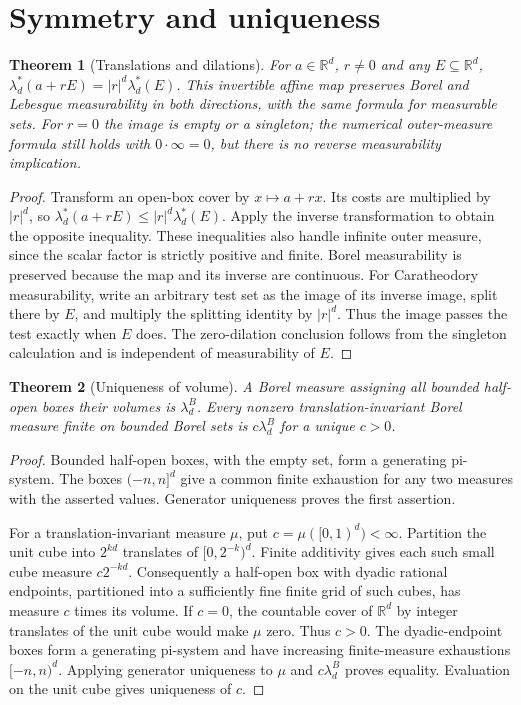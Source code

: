 \documentclass[11pt,oneside,openany]{book}
\newtheorem{theorem}{Theorem}[chapter]
\theoremstyle{definition}
\theoremstyle{remark}
\newcommand{\R}{\mathbb R}\newcommand{\C}{\mathbb C}
\newcommand{\family}[1]{}
\begin{document}
\section{Symmetry and uniqueness}

\begin{theorem}[Translations and dilations]
\family{D11.03.translation_dilation}\label{d11:03:translation-dilation}
For $a\in\R^d$, $r\ne0$ and any $E\subseteq\R^d$,
$\lambda_d^*(a+rE)=|r|^d\lambda_d^*(E)$. This invertible affine map
preserves Borel and Lebesgue measurability in both directions, with the same
formula for measurable sets. For $r=0$ the image is empty or a singleton;
the numerical outer-measure formula still holds with $0\cdot\infty=0$,
but there is no reverse measurability implication.
\end{theorem}
\begin{proof}
Transform an open-box cover by $x\mapsto a+rx$. Its costs are multiplied
by $|r|^d$, so $\lambda_d^*(a+rE)\leq|r|^d\lambda_d^*(E)$.
Apply the inverse transformation to obtain the opposite inequality.
These inequalities also handle infinite outer measure, since the scalar
factor is strictly positive and finite. Borel measurability is preserved
because the map and its inverse are continuous. For Caratheodory measurability,
write an arbitrary test set as the image of its inverse image, split there by
$E$, and multiply the splitting identity by $|r|^d$. Thus the image passes
the test exactly when $E$ does. The zero-dilation conclusion follows from
the singleton calculation and is independent of measurability of $E$.
\end{proof}

\begin{theorem}[Uniqueness of volume]
\family{D11.03.euclidean_measure_uniqueness}\label{d11:03:euclidean-measure-uniqueness}
A Borel measure assigning all bounded half-open boxes their volumes is
$\lambda_d^B$. Every nonzero translation-invariant Borel measure finite on
bounded Borel sets is $c\lambda_d^B$ for a unique $c>0$.
\end{theorem}
\begin{proof}
Bounded half-open boxes, with the empty set, form a generating pi-system.
The boxes $(-n,n]^d$ give a common finite exhaustion for any two measures
with the asserted values. Generator uniqueness proves the first assertion.

For a translation-invariant measure $\mu$, put $c=\mu([0,1)^d)<\infty$.
Partition the unit cube into $2^{kd}$ translates of $[0,2^{-k})^d$.
Finite additivity gives each such small cube measure $c2^{-kd}$.
Consequently a half-open box with dyadic rational endpoints, partitioned
into a sufficiently fine finite grid of such cubes, has measure $c$ times
its volume. If $c=0$, the countable cover of $\R^d$ by integer translates
of the unit cube would make $\mu$ zero. Thus $c>0$. The dyadic-endpoint
boxes form a generating pi-system and have increasing finite-measure
exhaustions $[-n,n)^d$. Applying generator uniqueness to $\mu$ and
$c\lambda_d^B$ proves equality. Evaluation on the unit cube gives uniqueness
of $c$.
\end{proof}
\end{document}
